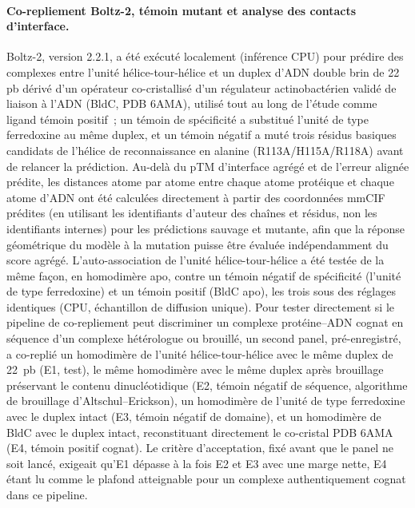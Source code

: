 \documentclass[11pt,a4paper]{article}
\begin{document}
\paragraph{Co-repliement Boltz-2, témoin mutant et analyse des contacts d'interface.} Boltz-2,
version 2.2.1, \citep{wohlwend2025boltz2} a été exécuté localement (inférence CPU) pour prédire des
complexes entre l'unité hélice-tour-hélice et un duplex d'ADN double brin de 22 pb dérivé d'un
opérateur co-cristallisé d'un régulateur actinobactérien validé de liaison à l'ADN (BldC, PDB
6AMA), utilisé tout au long de l'étude comme ligand témoin positif~; un témoin de spécificité a
substitué l'unité de type ferredoxine au même duplex, et un témoin négatif a muté trois résidus
basiques candidats de l'hélice de reconnaissance en alanine (R113A/H115A/R118A) avant de relancer
la prédiction. Au-delà du pTM d'interface agrégé et de l'erreur alignée prédite, les distances
atome par atome entre chaque atome protéique et chaque atome d'ADN ont été calculées directement à
partir des coordonnées mmCIF prédites (en utilisant les identifiants d'auteur des chaînes et
résidus, non les identifiants internes) pour les prédictions sauvage et mutante, afin que la
réponse géométrique du modèle à la mutation puisse être évaluée indépendamment du score agrégé.
L'auto-association de l'unité hélice-tour-hélice a été testée de la même façon, en homodimère apo,
contre un témoin négatif de spécificité (l'unité de type ferredoxine) et un témoin positif (BldC
apo), les trois sous des réglages identiques (CPU, échantillon de diffusion unique). Pour tester
directement si le pipeline de co-repliement peut discriminer un complexe protéine--ADN cognat en
séquence d'un complexe hétérologue ou brouillé, un second panel, pré-enregistré, a co-replié un
homodimère de l'unité hélice-tour-hélice avec le même duplex de 22~pb (E1, test), le même homodimère
avec le même duplex après brouillage préservant le contenu dinucléotidique (E2, témoin négatif de
séquence, algorithme de brouillage d'Altschul--Erickson), un homodimère de l'unité de type
ferredoxine avec le duplex intact (E3, témoin négatif de domaine), et un homodimère de BldC avec le
duplex intact, reconstituant directement le co-cristal PDB 6AMA (E4, témoin positif cognat). Le
critère d'acceptation, fixé avant que le panel ne soit lancé, exigeait qu'E1 dépasse à la fois E2 et
E3 avec une marge nette, E4 étant lu comme le plafond atteignable pour un complexe authentiquement
cognat dans ce pipeline.
\end{document}
